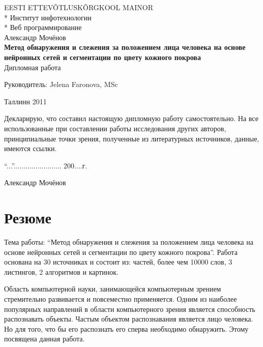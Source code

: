 \documentclass[12pt]{report}
\begin{document}

\begin{titlepage}
  \begin{center}
	\uppercase{Eesti Ettev\~{o}tlusk\~{o}rgkool Mainor}\\*
	Институт инфотехнологии\\*
	Веб программирование\\[6cm]
	Александр Мочёнов\\[2.5cm]
	\large
	\textbf{Метод обнаружения и слежения за положением лица человека на основе нейронных сетей и 
сегментации по цвету кожного покрова}\\[1cm]
	\normalsize
	Дипломная работа\\[3.5cm]
	\begin{flushright}
		Руководитель: Jelena Faronova, MSc\\[6cm]
	\end{flushright}
	Таллинн 2011
  \end{center}
  
Декларирую, что составил настоящую
дипломную работу самостоятельно.
На все использованные при составлении
работы исследования других авторов,
принципиальные точки зрения,
полученные из литературных источников,
данные, имеются ссылки.
\\[2cm]
\begin{flushright}
``...''........................ 200....г.

Александр Мочёнов
\end{flushright}

\end{titlepage}

\tableofcontents{\thispagestyle{fancyplain}}

\chapter*{Резюме}
\thispagestyle{fancy}

Тема работы: ``Метод обнаружения и слежения за положением лица человека на основе нейронных сетей и 
сегментации по цвету кожного покрова''. Работа основана на 30 источниках и состоит из:  частей, более чем 10000 слов, 3 листингов, 2 алгоритмов и  картинок.

Область компьютерной науки, занимающейся компьютерным зрением стремительно развивается и повсеместно 
применяется. Одним из наиболее популярных направлений в области компьютерного зрения является способность 
распознавать объекты. Частым объектом распознавания является лицо человека. Но для того, что бы его распознать его 
сперва необходимо обнаружить. Этому посвящена данная работа.
\end{document}
